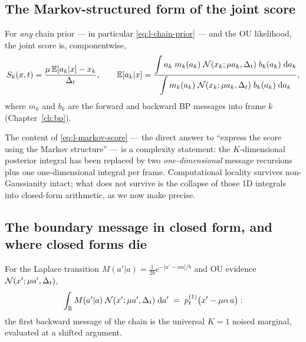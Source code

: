 \subsection{The Markov-structured form of the joint score}

\begin{theorem}\label{thm:l-markov-score}
For \emph{any} chain prior --- in particular \eqref{eq:l-chain-prior} ---
and the OU likelihood, the joint score is, componentwise,
\begin{equation}
  S_k(x, t) = \frac{\mu\, \mathbb{E}[a_k | x] - x_k}{\Delta_t},
  \qquad
  \mathbb{E}[a_k | x]
  = \frac{\displaystyle\int a_k\; m_k(a_k)\; \mathcal{N}(x_k; \mu a_k, \Delta_t)\;
      b_k(a_k)\;\mathrm{d} a_k}
     {\displaystyle\int m_k(a_k)\; \mathcal{N}(x_k; \mu a_k, \Delta_t)\;
      b_k(a_k)\;\mathrm{d} a_k},
  \label{eq:l-markov-score}
\end{equation}
where $m_k$ and $b_k$ are the forward and backward BP messages into frame
$k$ (Chapter~\ref{ch:bp}).
\end{theorem}

The content of \eqref{eq:l-markov-score} --- the direct answer to
``express the score using the Markov structure'' --- is a complexity
statement: the $K$-dimensional posterior integral has been replaced by two
\emph{one-dimensional} message recursions plus one one-dimensional integral
per frame. Computational locality survives non-Gaussianity intact; what
does not survive is the collapse of those 1D integrals into closed-form
arithmetic, as we now make precise.

\subsection{The boundary message in closed form, and where closed forms
die}

\begin{proposition}\label{prop:l-onestep}
For the Laplace transition $M(a'|a) = \frac{1}{2b} e^{-|a' - \alpha a|/b}$
and OU evidence $\mathcal{N}(x'; \mu a', \Delta_t)$,
\begin{equation}
  \int_{\mathbb{R}} M(a' | a)\; \mathcal{N}(x'; \mu a', \Delta_t)\; \mathrm{d} a'
  \;=\; p_t^{(1)}\big( x' - \mu\alpha\, a \big) :
  \label{eq:l-onestep}
\end{equation}
the first backward message of the chain is the universal $K = 1$ noised
marginal, evaluated at a shifted argument.
\end{proposition}

